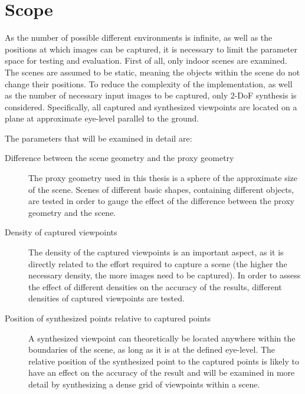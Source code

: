 \section*{Scope}
As the number of possible different environments is infinite, as well as the positions at which images can be captured, it is necessary to limit the parameter space for testing and evaluation. First of all, only indoor scenes are examined. The scenes are assumed to be static, meaning the objects within the scene do not change their positions. To reduce the complexity of the implementation, as well as the number of necessary input images to be captured, only 2-DoF synthesis is considered. Specifically, all captured and synthesized viewpoints are located on a plane at approximate eye-level parallel to the ground. 

The parameters that will be examined in detail are:
\begin{description}
  \item[Difference between the scene geometry and the proxy geometry] The proxy geometry used in this thesis is a sphere of the approximate size of the scene. Scenes of different basic shapes, containing different objects, are tested in order to gauge the effect of the difference between the proxy geometry and the scene.
  \item[Density of captured viewpoints] The density of the captured viewpoints is an important aspect, as it is directly related to the effort required to capture a scene (the higher the necessary density, the more images need to be captured). In order to assess the effect of different densities on the accuracy of the results, different densities of captured viewpoints are tested.
  \item[Position of synthesized points relative to captured points] A synthesized viewpoint can theoretically be located anywhere within the boundaries of the scene, as long as it is at the defined eye-level. The relative position of the synthesized point to the captured points is likely to have an effect on the accuracy of the result and will be examined in more detail by synthesizing a dense grid of viewpoints within a scene.
\end{description}

